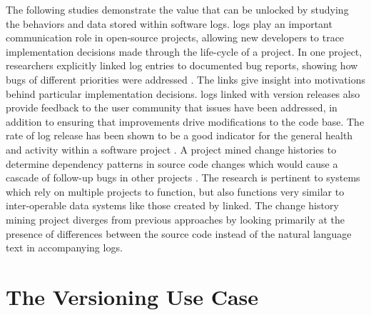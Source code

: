 The following studies demonstrate the value that can be unlocked by studying the behaviors and data stored within software \glspl{log}.
\Glspl{log} play an important communication role in open-source projects, allowing new developers to trace implementation decisions made through the life-cycle of a project.
In one project, researchers explicitly linked \gls{log} entries to documented bug reports, showing how bugs of different priorities were addressed \cite{Chen:2004:OCL:990374.990391}.
The links give insight into motivations behind particular implementation decisions.
\Glspl{log} linked with \gls{version} releases also provide feedback to the user community that issues have been addressed, in addition to ensuring that improvements drive modifications to the code base.
The rate of \gls{log} release has been shown to be a good indicator for the general health and activity within a software project \cite{German03automatingthe}.
A project mined change histories to determine dependency patterns in source code changes which would cause a cascade of follow-up bugs in other projects \cite{6132954}.
The research is pertinent to systems which rely on multiple projects to function, but also functions very similar to inter-operable data systems like those created by \gls{linked}.
The change history mining project diverges from previous approaches by looking primarily at the presence of differences between the source code instead of the natural language text in accompanying logs.

\section{The Versioning Use Case} \label{sec:usecase}

